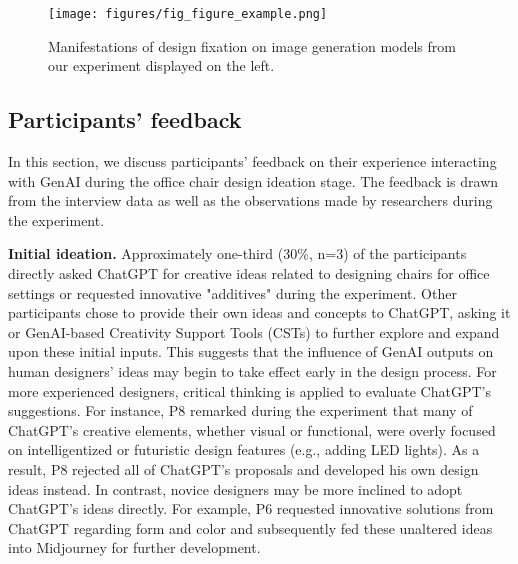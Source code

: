 \begin{figure*}[htp]
    \centering
    \texttt{[image: figures/fig\_figure\_example.png]}
    \caption{Manifestations of design fixation on image generation models from our experiment displayed on the left.}
    \vspace{-0.05in}
    \label{fig_image_manifestion}
    \Description{}
\end{figure*}

\subsection{Participants' feedback}
\label{subsection_Participants'_feedback}

In this section, we discuss participants' feedback on their experience interacting with GenAI during the office chair design ideation stage. The feedback is drawn from the interview data as well as the observations made by researchers during the experiment. 

\textbf{Initial ideation.}
Approximately one-third (30\%, n=3) of the participants directly asked ChatGPT for creative ideas related to designing chairs for office settings or requested innovative "additives" during the experiment. Other participants chose to provide their own ideas and concepts to ChatGPT, asking it or GenAI-based Creativity Support Tools (CSTs) to further explore and expand upon these initial inputs. This suggests that the influence of GenAI outputs on human designers' ideas may begin to take effect early in the design process. For more experienced designers, critical thinking is applied to evaluate ChatGPT's suggestions. For instance, P8 remarked during the experiment that many of ChatGPT's creative elements, whether visual or functional, were overly focused on intelligentized or futuristic design features (e.g., adding LED lights). As a result, P8 rejected all of ChatGPT’s proposals and developed his own design ideas instead. In contrast, novice designers may be more inclined to adopt ChatGPT's ideas directly. For example, P6 requested innovative solutions from ChatGPT regarding form and color and subsequently fed these unaltered ideas into Midjourney for further development.\\

